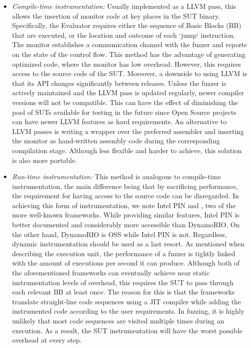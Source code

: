 \begin{itemize}
    \item \textit{Compile-time instrumentation:} Usually implemented as a LLVM pass, this allows the insertion of monitor code at key places in the SUT binary. Specifically, the Evaluator requires either the sequence of Basic Blocks (BB) that are executed, or the location and outcome of each `jump` instruction. The monitor establishes a communication channel with the fuzzer and reports on the state of the control flow. This method has the advantage of generating optimized code, where the monitor has low overhead. However, this requires access to the source code of the SUT. Moreover, a downside to using LLVM is that its API changes significantly between releases. Unless the fuzzer is actively maintained and the LLVM pass is updated regularly, newer compiler versions will not be compatible. This can have the effect of diminishing the pool of SUTs available for testing in the future since Open Source projects can have newer LLVM features as hard requirements. An alternative to LLVM passes is writing a wrapper over the preferred assembler and inserting the monitor as hand-written assembly code during the corresponding compilation stage. Although less flexible and harder to achieve, this solution is also more portable.

    \item \textit{Run-time instrumentation:} This method is analogous to compile-time instrumentation, the main difference being that by sacrificing performance, the requirement for having access to the source code can be disregarded. In achieving this form of instrumentation, we note Intel PIN \cite{luk2005pin}
    and \cite{bruening2003infrastructure}, two of the more well-known frameworks. While providing similar features, Intel PIN is better documented and considerably more accessible than DynamoRIO. On the other hand, DynamoRIO is OSS while Intel PIN is not. Regardless, dynamic instrumentation should be used as a last resort. As mentioned when describing the execution unit, the performance of a fuzzer is tightly linked with the amount of executions per second it can produce. Although both of the aforementioned frameworks can eventually achieve near static instrumentation levels of overhead, this requires the SUT to pass through each relevant BB at least once. The reason for this is that the frameworks translate straight-line code sequences using a JIT compiler while adding the instrumented code according to the user requirements. In fuzzing, it is highly unlikely that most code sequences are visited multiple times during an execution. As a result, the SUT instrumentation will have the worst possible overhead at every step.


\end{itemize}
